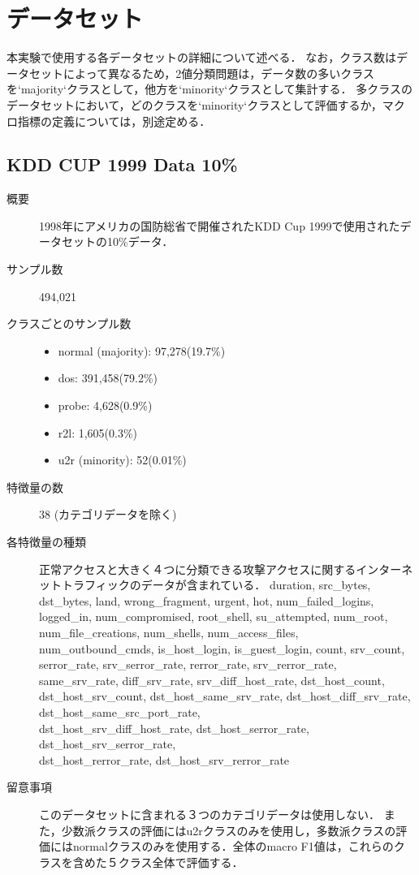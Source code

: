 \section{データセット}
\label{sec:dataset}
本実験で使用する各データセットの詳細について述べる．
なお，クラス数はデータセットによって異なるため，2値分類問題は，データ数の多いクラスを`majority`クラスとして，他方を`minority`クラスとして集計する．
多クラスのデータセットにおいて，どのクラスを`minority`クラスとして評価するか，マクロ指標の定義については，別途定める．

\subsection{KDD CUP 1999 Data 10\%}
\begin{description}
    \item[概要] 1998年にアメリカの国防総省で開催されたKDD Cup 1999で使用されたデータセットの10\%データ．
    \item[サンプル数] 494,021
    \item[クラスごとのサンプル数] \mbox{}
        \begin{itemize}
            \item normal (majority):  97,278(19.7\%)
            \item dos:      391,458(79.2\%)
            \item probe:    4,628(0.9\%)
            \item r2l:      1,605(0.3\%)
            \item u2r (minority):      52(0.01\%)
        \end{itemize}
    \item[特徴量の数] 38 (カテゴリデータを除く)
    \item[各特徴量の種類] 正常アクセスと大きく４つに分類できる攻撃アクセスに関するインターネットトラフィックのデータが含まれている．
            duration, src\_bytes, dst\_bytes, land, wrong\_fragment, urgent, hot, num\_failed\_logins, logged\_in, num\_compromised, root\_shell, su\_attempted, num\_root, num\_file\_creations, num\_shells, num\_access\_files, num\_outbound\_cmds, is\_host\_login, is\_guest\_login, count, srv\_count, serror\_rate, srv\_serror\_rate, rerror\_rate, srv\_rerror\_rate, same\_srv\_rate, diff\_srv\_rate, srv\_diff\_host\_rate, dst\_host\_count, dst\_host\_srv\_count, dst\_host\_same\_srv\_rate, dst\_host\_diff\_srv\_rate, dst\_host\_same\_src\_port\_rate, \\dst\_host\_srv\_diff\_host\_rate, dst\_host\_serror\_rate, dst\_host\_srv\_serror\_rate, \\dst\_host\_rerror\_rate, dst\_host\_srv\_rerror\_rate
    \item[留意事項] このデータセットに含まれる３つのカテゴリデータは使用しない．
                   また，少数派クラスの評価にはu2rクラスのみを使用し，多数派クラスの評価にはnormalクラスのみを使用する．全体のmacro F1値は，これらのクラスを含めた５クラス全体で評価する．
\end{description}

